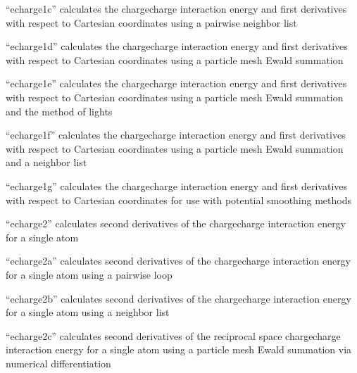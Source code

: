 \documentclass[letterpaper,11pt,english]{sphinxmanual}
\begin{document}

“echarge1c” calculates the charge\sphinxhyphen{}charge interaction energy
and first derivatives with respect to Cartesian coordinates
using a pairwise neighbor list


“echarge1d” calculates the charge\sphinxhyphen{}charge interaction energy
and first derivatives with respect to Cartesian coordinates
using a particle mesh Ewald summation


“echarge1e” calculates the charge\sphinxhyphen{}charge interaction energy
and first derivatives with respect to Cartesian coordinates
using a particle mesh Ewald summation and the method of lights


“echarge1f” calculates the charge\sphinxhyphen{}charge interaction energy
and first derivatives with respect to Cartesian coordinates
using a particle mesh Ewald summation and a neighbor list


“echarge1g” calculates the charge\sphinxhyphen{}charge interaction energy
and first derivatives with respect to Cartesian coordinates
for use with potential smoothing methods


“echarge2” calculates second derivatives of the
charge\sphinxhyphen{}charge interaction energy for a single atom


“echarge2a” calculates second derivatives of the charge\sphinxhyphen{}charge
interaction energy for a single atom using a pairwise loop


“echarge2b” calculates second derivatives of the charge\sphinxhyphen{}charge
interaction energy for a single atom using a neighbor list


“echarge2c” calculates second derivatives of the reciprocal
space charge\sphinxhyphen{}charge interaction energy for a single atom using
a particle mesh Ewald summation via numerical differentiation

\end{document}
